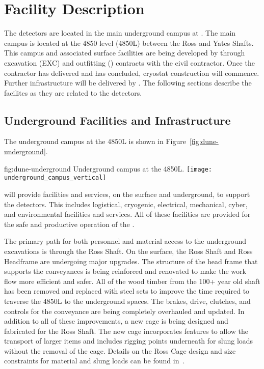 \chapter{Facility Description}
\label{vl:tc-facility}

The  detectors are located in the main underground campus
at . The main campus is located at the 4850 level (4850L) between
the Ross and Yates Shafts. This campus and associated surface
facilities are being developed by  through excavation
(EXC) and outfitting () contracts with the civil
contractor. Once the contractor has delivered and  has
concluded, cryostat construction will commence. Further infrastructure
will be delivered by .  The following sections describe
the facilites as they are related to the  detectors.

\section{Underground Facilities and Infrastructure}
\label{sec:fdsp-coord-uderground-excavation}

The  underground campus at the  4850L is shown in
Figure~\ref{fig:dune-underground}.
\begin{dunefigure}{fig:dune-underground}
  {Underground campus at the 4850L.}
  \texttt{[image: underground\_campus\_vertical]}
\end{dunefigure}
 will provide facilities and services, on the surface and
underground, to support the  detectors.  This includes
logistical, cryogenic, electrical, mechanical, cyber, and environmental
facilities and services.  All of these facilities are provided for the
safe and productive operation of the .

The primary path for both personnel and material access to the
underground excavations is through the Ross Shaft. On the surface, the
Ross Shaft and Ross Headframe are undergoing major upgrades. The
structure of the head frame that supports the conveyances is being
reinforced and renovated to make the work flow more efficient and
safer.  All of the wood timber from the 100+ year old shaft has been
removed and replaced with steel sets to improve the time required to
traverse the 4850L to the underground spaces.  The brakes, drive,
clutches, and controls for the conveyance are being completely
overhauled and updated.  In addition to all of these improvements, a
new cage is being designed and fabricated for the Ross Shaft.  The new
cage incorporates features to allow the transport of larger items and
includes rigging points underneath for slung loads without the removal
of the cage.  Details on the Ross Cage design and size constraints for
material and slung loads can be found in~.


